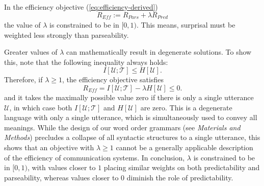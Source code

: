 \documentclass[10pt,twoside,lineno]{article}
\newcommand{\utterance}{\mathcal{U}}
\newcommand{\tree}{\mathcal{T}}
\begin{document}
In the efficiency objective (\ref{eq:efficiency-derived})
\begin{equation}\label{eq:efficiency}
	R_{\textit{Eff}} := R_{\textit{Pars}} + \lambda R_\textit{Pred}
\end{equation}
the value of $\lambda$ is constrained to be in $[0,1)$.
This means, surprisal must be weighted less strongly than parseability.

Greater values of $\lambda$ can mathematically result in degenerate solutions.
To show this, note that the following inequality always holds:
\begin{equation}
I[\utterance; \tree] \leq H[\utterance].
\end{equation}
Therefore, if $\lambda \geq 1$, the efficiency objective satisfies 
\begin{equation}
    R_{Eff} = I[\utterance; \tree] - \lambda H[\utterance] \leq 0.
\end{equation}
and it takes the maximally possible value zero if there is only a single utterance $\utterance$, in which case both $I[\utterance; \tree]$ and $H[\utterance]$ are zero.
This is a degenerate language with only a single utterance, which is simultaneously used to convey all meanings.
While the design of our word order grammars (see \emph{Materials and Methods}) precludes a collapse of all syntactic structures to a single utterance, this shows that an objective with $\lambda \geq 1$ cannot be a generally applicable description of the efficiency of communication systems.
In conclusion, $\lambda$ is constrained to be in $[0,1)$, with values closer to $1$ placing similar weights on both predictability and parseability, whereas values closer to $0$ diminish the role of predictability.
\end{document}
